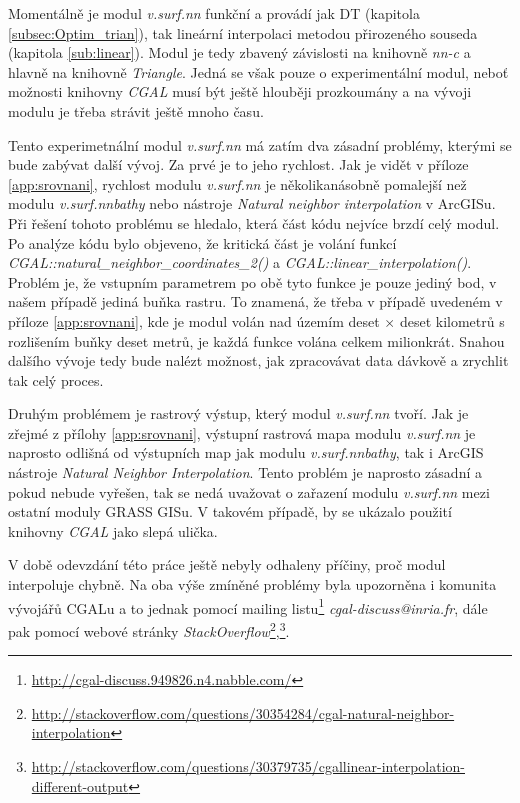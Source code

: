 \documentclass[12pt,a4paper]{article}
\begin{document}
Momentálně je modul \emph{v.surf.nn} funkční a provádí jak DT (kapitola \ref{subsec:Optim_trian}),
tak lineární interpolaci metodou přirozeného souseda (kapitola \ref{sub:linear}).
Modul je tedy zbavený závislosti na knihovně \emph{nn-c} a hlavně na knihovně \emph{Triangle}.
Jedná se však pouze o experimentální modul, neboť možnosti knihovny \emph{CGAL} musí být ještě hlouběji prozkoumány a na vývoji modulu je třeba strávit ještě mnoho času.

Tento experimetnální modul \emph{v.surf.nn} má zatím dva zásadní problémy,
kterými se bude zabývat další vývoj. Za prvé je to jeho rychlost. 
Jak je vidět v příloze \ref{app:srovnani}, rychlost modulu \emph{v.surf.nn} je 
několikanásobně pomalejší než modulu \emph{v.surf.nnbathy} nebo nástroje 
\emph{Natural neighbor interpolation} v ArcGISu. Při řešení tohoto problému se hledalo, 
která část kódu nejvíce brzdí celý modul. Po analýze kódu bylo objeveno, 
že kritická část je volání funkcí \emph{CGAL::natural\_neighbor\_coordinates\_2()} a
 \emph{CGAL::linear\_interpolation()}. Problém je, že vstupním parametrem po obě tyto 
 funkce je pouze jediný bod, v našem případě jediná buňka rastru. To znamená, že 
třeba v případě uvedeném v příloze \ref{app:srovnani}, kde je modul volán nad územím 
deset $\times$ deset kilometrů s rozlišením buňky deset metrů, je každá funkce volána
celkem milionkrát. Snahou dalšího vývoje tedy bude nalézt možnost, jak zpracovávat 
data dávkově a zrychlit tak celý proces.

Druhým problémem je rastrový výstup, který modul \emph{v.surf.nn} tvoří. Jak je zřejmé 
z přílohy \ref{app:srovnani}, výstupní rastrová mapa modulu \emph{v.surf.nn} je naprosto 
odlišná od výstupních map jak modulu \emph{v.surf.nnbathy}, tak i ArcGIS nástroje 
\emph{Natural Neighbor Interpolation}. Tento problém je naprosto zásadní a pokud nebude vyřešen,
tak se nedá uvažovat o zařazení modulu \emph{v.surf.nn} mezi ostatní moduly GRASS GISu. 
V takovém případě, by se ukázalo použití knihovny \emph{CGAL} jako slepá ulička.

V době odevzdání této práce ještě nebyly odhaleny příčiny, proč modul interpoluje chybně.
Na oba výše zmíněné problémy byla upozorněna i komunita vývojářů CGALu a to jednak pomocí 
mailing listu\footnote{\url{http://cgal-discuss.949826.n4.nabble.com/}} \emph{cgal-discuss@inria.fr}, dále pak pomocí webové stránky
\emph{StackOverflow}\footnote{\url{http://stackoverflow.com/questions/30354284/cgal-natural-neighbor-interpolation}},\footnote{\url{http://stackoverflow.com/questions/30379735/cgallinear-interpolation-different-output}}.
\end{document}
